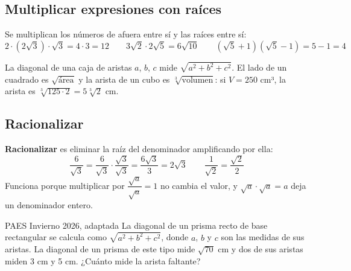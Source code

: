 \subsection{Multiplicar expresiones con raíces}
Se multiplican los números de afuera entre sí y las raíces entre sí:
\[ 2\cdot\left(2\sqrt{3}\right)\cdot\sqrt{3} = 4\cdot 3 = 12 \qquad 3\sqrt{2}\cdot 2\sqrt{5} = 6\sqrt{10} \qquad \left(\sqrt{5} + 1\right)\left(\sqrt{5} - 1\right) = 5 - 1 = 4 \]
\begin{ejemplo}[En contexto] La diagonal de una caja de aristas $a$, $b$, $c$ mide $\sqrt{a^2 + b^2 + c^2}$. El lado de un cuadrado es $\sqrt{\text{área}}$ y la arista de un cubo es $\sqrt[3]{\text{volumen}}$: si $V = 250$ cm³, la arista es $\sqrt[3]{125\cdot 2} = 5\sqrt[3]{2}$ cm.\end{ejemplo}

\subsection{Racionalizar}
\textbf{Racionalizar} es eliminar la raíz del denominador amplificando por ella:
\[ \frac{6}{\sqrt{3}} = \frac{6}{\sqrt{3}}\cdot\frac{\sqrt{3}}{\sqrt{3}} = \frac{6\sqrt{3}}{3} = 2\sqrt{3} \qquad \frac{1}{\sqrt{2}} = \frac{\sqrt{2}}{2} \]
Funciona porque multiplicar por $\dfrac{\sqrt{a}}{\sqrt{a}} = 1$ no cambia el valor, y $\sqrt{a}\cdot\sqrt{a} = a$ deja un denominador entero.

\begin{elejemplo}{PAES Invierno 2026, adaptada}
La diagonal de un prisma recto de base rectangular se calcula como $\sqrt{a^2 + b^2 + c^2}$, donde $a$, $b$ y $c$ son las medidas de sus aristas. La diagonal de un prisma de este tipo mide $\sqrt{70}$ cm y dos de sus aristas miden 3 cm y 5 cm. ¿Cuánto mide la arista faltante?
\alts{6 cm}{8 cm}{36 cm}{62 cm}
\end{elejemplo}

